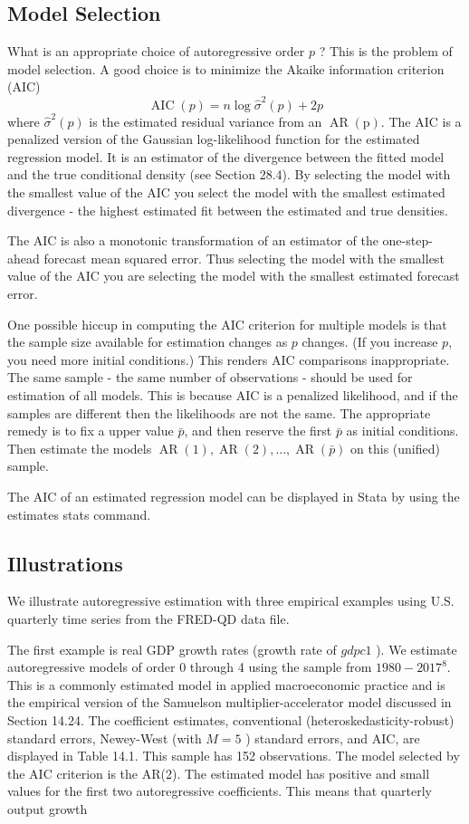 \documentclass[10pt]{article}
\begin{document}
\subsection{Model Selection}
What is an appropriate choice of autoregressive order $p$ ? This is the problem of model selection. A good choice is to minimize the Akaike information criterion (AIC)
$$
\operatorname{AIC}(p)=n \log \widehat{\sigma}^{2}(p)+2 p
$$
where $\widehat{\sigma}^{2}(p)$ is the estimated residual variance from an $\operatorname{AR}(\mathrm{p})$. The AIC is a penalized version of the Gaussian log-likelihood function for the estimated regression model. It is an estimator of the divergence between the fitted model and the true conditional density (see Section 28.4). By selecting the model with the smallest value of the AIC you select the model with the smallest estimated divergence - the highest estimated fit between the estimated and true densities.

The AIC is also a monotonic transformation of an estimator of the one-step-ahead forecast mean squared error. Thus selecting the model with the smallest value of the AIC you are selecting the model with the smallest estimated forecast error.

One possible hiccup in computing the AIC criterion for multiple models is that the sample size available for estimation changes as $p$ changes. (If you increase $p$, you need more initial conditions.) This renders AIC comparisons inappropriate. The same sample - the same number of observations - should be used for estimation of all models. This is because AIC is a penalized likelihood, and if the samples are different then the likelihoods are not the same. The appropriate remedy is to fix a upper value $\bar{p}$, and then reserve the first $\bar{p}$ as initial conditions. Then estimate the models $\operatorname{AR}(1), \operatorname{AR}(2), \ldots, \operatorname{AR}(\bar{p})$ on this (unified) sample.

The AIC of an estimated regression model can be displayed in Stata by using the estimates stats command.

\subsection{Illustrations}
We illustrate autoregressive estimation with three empirical examples using U.S. quarterly time series from the FRED-QD data file.

The first example is real GDP growth rates (growth rate of $g d p c 1$ ). We estimate autoregressive models of order 0 through 4 using the sample from $1980-2017^{8}$. This is a commonly estimated model in applied macroeconomic practice and is the empirical version of the Samuelson multiplier-accelerator model discussed in Section 14.24. The coefficient estimates, conventional (heteroskedasticity-robust) standard errors, Newey-West (with $M=5$ ) standard errors, and AIC, are displayed in Table 14.1. This sample has 152 observations. The model selected by the AIC criterion is the AR(2). The estimated model has positive and small values for the first two autoregressive coefficients. This means that quarterly output growth
\end{document}
